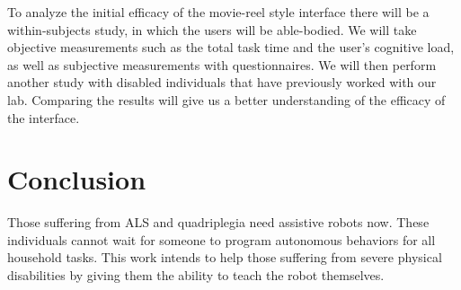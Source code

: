 \documentclass[letterpaper]{article}
\begin{document}
To analyze the initial efficacy of the movie-reel style interface there will be a within-subjects study, in which the users will be able-bodied. We will take objective measurements such as the total task time and the user's cognitive load, as well as subjective measurements with questionnaires. We will then perform another study with disabled individuals that have previously worked with our lab. Comparing the results will give us a better understanding of the efficacy of the interface.



\section{Conclusion}

Those suffering from ALS and quadriplegia need assistive robots now. These individuals cannot wait for someone to program autonomous behaviors for all household tasks.  This work intends to help those suffering from severe physical disabilities by giving them the ability to teach the robot themselves.

\end{document}
